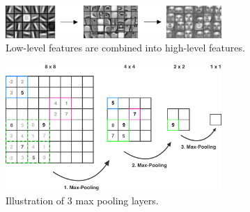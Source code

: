 \begin{figure}
    \begin{subfigure}{1\textwidth}
        \centering
        \includegraphics[width=0.9\textwidth]{resources/images/abstraction.png}
        \caption{Low-level features are combined into high-level features.}
        \label{fig:abstraction}
    \end{subfigure}
    \vspace{0.5cm}
    \begin{subfigure}{0.7\textwidth}
        \centering
        \includegraphics[width=0.9\textwidth]{resources/images/max_pooling.png}
        \caption{Illustration of 3 max pooling layers.}
        \label{fig:max_pooling}
    \end{subfigure}
    \begin{subfigure}{0.25\textwidth}
        \centering

\end{subfigure}
\end{figure}

